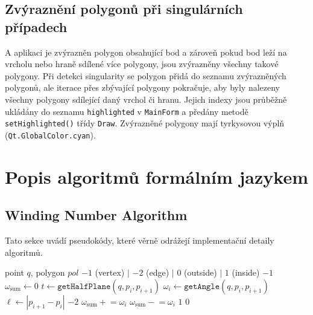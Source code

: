 \documentclass[11pt, a4paper]{article}
\begin{document}
\subsection{Zvýraznění polygonů při singulárních případech}

A aplikaci je zvýrazněn polygon obsahující bod a zároveň pokud bod leží na vrcholu nebo hraně sdílené více polygony, jsou zvýrazněny všechny takové polygony. Při detekci singularity se polygon přidá do seznamu zvýrazněných polygonů, ale iterace přes zbývající polygony pokračuje, aby byly nalezeny všechny polygony sdílející daný vrchol či hranu. Jejich indexy jsou průběžně ukládány do seznamu \texttt{highlighted} v \texttt{MainForm} a předány metodě \texttt{setHighlighted()} třídy \texttt{Draw}. Zvýrazněné polygony mají tyrkysovou výplň (\texttt{Qt.GlobalColor.cyan}).

\section{Popis algoritmů formálním jazykem}

\subsection{Winding Number Algorithm}

Tato sekce uvádí pseudokódy, které věrně odrážejí implementační detaily algoritmů.

\begin{algorithm}[H] \caption{Winding Number} 
\begin{algorithmic}[1]
\Require point $q$, polygon $pol$ 
\Ensure $-1$ (vertex) $|$ $-2$ (edge) $|$ $0$ (outside) $|$ $1$ (inside)
     \Return $-1$ \EndIf
\EndFor
\State $\omega_\text{sum} \gets 0$
    \State $t \gets \texttt{getHalfPlane}(q, p_i, p_{i+1})$
    \State $\omega_i \gets \texttt{getAngle}(q, p_i, p_{i+1})$
    \State $\ell \gets |p_{i+1} - p_i|$
     \Return $-2$ \EndIf
     $\omega_\text{sum} \mathrel{+}= \omega_i$
    \Else{} $\omega_\text{sum} \mathrel{-}= \omega_i$
    \EndIf
\EndFor
{} \Return $1$ \Else{} \Return $0$ \EndIf
\end{algorithmic} 
\end{algorithm}
\end{document}
